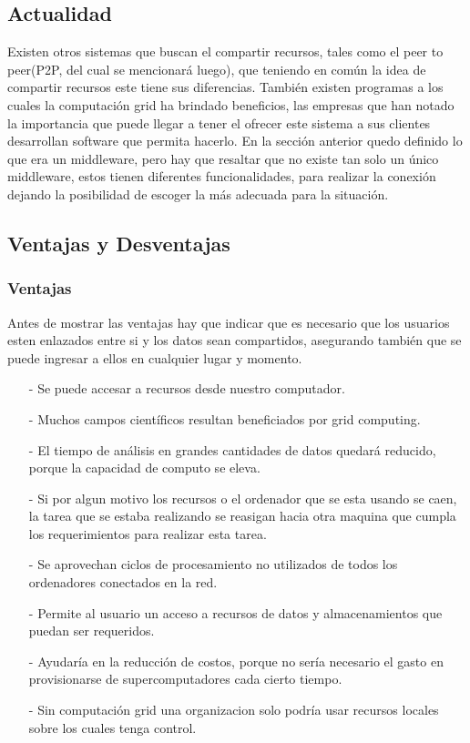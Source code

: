 \documentclass[12pt]{article}
\begin{document}
{{\subsection{Actualidad}
Existen otros sistemas que buscan el compartir recursos, tales como el peer to peer(P2P, del cual se mencionar\'a luego), que teniendo en com\'un la idea de compartir recursos este tiene sus diferencias.
Tambi\'en existen programas a los cuales la computaci\'on grid ha brindado beneficios, las empresas que han notado la importancia que puede llegar a tener el ofrecer este sistema a sus clientes desarrollan software que permita hacerlo.
En la secci\'on anterior quedo definido lo que era un middleware, pero hay que resaltar que no existe tan solo un \'unico middleware, estos tienen diferentes funcionalidades, para realizar la conexi\'on dejando la posibilidad de escoger la m\'as adecuada para la situaci\'on.\\

\subsection{Ventajas y Desventajas}

\subsubsection{Ventajas}
Antes de mostrar las ventajas hay que indicar que es necesario que los usuarios esten enlazados entre si y los datos sean compartidos, asegurando tambi\'en que se puede ingresar a ellos en cualquier lugar y momento.\\
\begin{itemize}
\item[-]Se puede accesar a recursos desde nuestro computador.
\item[-]Muchos campos cient\'ificos resultan beneficiados por grid computing.
\item[-]El tiempo de an\'alisis en grandes cantidades de datos quedar\'a reducido, porque la capacidad de computo se eleva.
\item[-]Si por algun motivo los recursos o el ordenador que se esta usando se caen, la tarea que se estaba realizando se reasigan hacia otra maquina que cumpla los requerimientos para realizar esta tarea.
\item[-]Se aprovechan ciclos de procesamiento no utilizados de todos los ordenadores conectados en la red.
\item[-]Permite al usuario un acceso a recursos de datos y almacenamientos que puedan ser requeridos.
\item[-]Ayudar\'ia en la reducci\'on de costos, porque no ser\'ia necesario el gasto en provisionarse de supercomputadores cada cierto tiempo.
\item[-]Sin computaci\'on grid una organizacion solo podr\'ia usar recursos locales sobre los cuales tenga control.
\end{itemize}

}}
\end{document}
